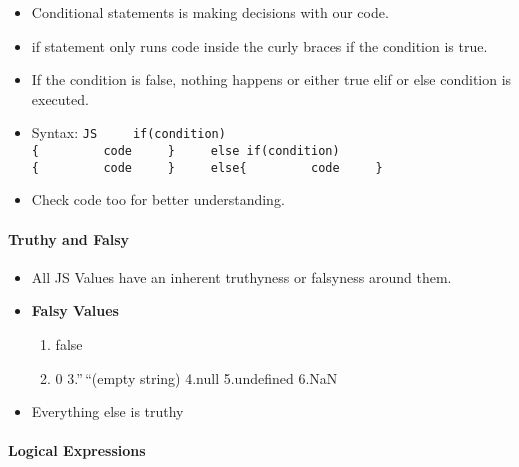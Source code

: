 \documentclass[
  paper=a4,
  ,captions=tableheading
]{scrartcl}
\providecommand{\tightlist}{%
  \setlength{\itemsep}{0pt}\setlength{\parskip}{0pt}}
\begin{document}
\begin{itemize}
\tightlist
\item
  Conditional statements is making decisions with our code.
\item
  if statement only runs code inside the curly braces if the condition
  is true.
\item
  If the condition is false, nothing happens or either true elif or else
  condition is executed.
\item
  Syntax:
  \texttt{JS\ \ \ \ \ if(condition)\{\ \ \ \ \ \ \ \ \ code\ \ \ \ \ \}\ \ \ \ \ else\ if(condition)\{\ \ \ \ \ \ \ \ \ code\ \ \ \ \ \}\ \ \ \ \ else\{\ \ \ \ \ \ \ \ \ code\ \ \ \ \ \}}
\item
  Check code too for better understanding.
\end{itemize}

\hypertarget{truthy-and-falsy}{%
\paragraph{Truthy and Falsy}\label{truthy-and-falsy}}

\begin{itemize}
\tightlist
\item
  All JS Values have an inherent truthyness or falsyness around them.
\item
  \textbf{Falsy Values}

  \begin{enumerate}
  \def\labelenumi{\arabic{enumi}.}
  \tightlist
  \item
    false
  \item
    0 3.''\,``(empty string) 4.null 5.undefined 6.NaN
  \end{enumerate}
\item
  Everything else is truthy
\end{itemize}

\hypertarget{logical-expressions}{%
\paragraph{Logical Expressions}\label{logical-expressions}}
\end{document}
